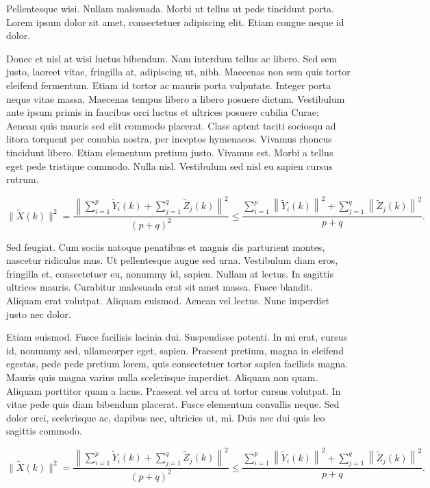 \documentclass[APA,STIX1COL]{WileyNJD-v2}
\begin{document}
Pellentesque wisi. Nullam malesuada. Morbi ut tellus ut pede tincidunt porta. Lorem ipsum dolor sit amet,
consectetuer adipiscing elit. Etiam congue neque id dolor.

Donec et nisl at wisi luctus bibendum. Nam interdum tellus ac libero. Sed sem justo, laoreet vitae, fringilla at,
adipiscing ut, nibh. Maecenas non sem quis tortor eleifend fermentum. Etiam id tortor ac mauris porta vulputate.
Integer porta neque vitae massa. Maecenas tempus libero a libero posuere dictum. Vestibulum ante ipsum primis in
faucibus orci luctus et ultrices posuere cubilia Curae; Aenean quis mauris sed elit commodo placerat. Class aptent
taciti sociosqu ad litora torquent per conubia nostra, per inceptos hymenaeos. Vivamus rhoncus tincidunt libero.
Etiam elementum pretium justo. Vivamus est. Morbi a tellus eget pede tristique commodo. Nulla nisl. Vestibulum
sed nisl eu sapien cursus rutrum.

\begin{equation}\label{eq23}
 \|\tilde{X}(k)\|^2
 =\frac{\left\|\sum\limits_{i=1}^{p}\tilde{Y}_i(k)+\sum\limits_{j=1}^{q}\tilde{Z}_j(k) \right\|^2}{(p+q)^2}
 \leq\frac{\sum\limits_{i=1}^{p}\left\|\tilde{Y}_i(k)\right\|^2+\sum\limits_{j=1}^{q}\left\|\tilde{Z}_j(k)\right\|^2 }{p+q}.
\end{equation}

Sed feugiat. Cum sociis natoque penatibus et magnis dis parturient montes, nascetur ridiculus mus. Ut pellentesque
augue sed urna. Vestibulum diam eros, fringilla et, consectetuer eu, nonummy id, sapien. Nullam at lectus. In sagittis
ultrices mauris. Curabitur malesuada erat sit amet massa. Fusce blandit. Aliquam erat volutpat. Aliquam euismod.
Aenean vel lectus. Nunc imperdiet justo nec dolor.

Etiam euismod. Fusce facilisis lacinia dui. Suspendisse potenti. In mi erat, cursus id, nonummy sed, ullamcorper
eget, sapien. Praesent pretium, magna in eleifend egestas, pede pede pretium lorem, quis consectetuer tortor sapien
facilisis magna. Mauris quis magna varius nulla scelerisque imperdiet. Aliquam non quam. Aliquam porttitor quam
a lacus. Praesent vel arcu ut tortor cursus volutpat. In vitae pede quis diam bibendum placerat. Fusce elementum
convallis neque. Sed dolor orci, scelerisque ac, dapibus nec, ultricies ut, mi. Duis nec dui quis leo sagittis commodo.

\begin{equation}\label{eq24}
 \|\tilde{X}(k)\|^2
 =\frac{\left\|\sum\limits_{i=1}^{p}\tilde{Y}_i(k)+\sum\limits_{j=1}^{q}\tilde{Z}_j(k) \right\|^2}{(p+q)^2}
 \leq\frac{\sum\limits_{i=1}^{p}\left\|\tilde{Y}_i(k)\right\|^2+\sum\limits_{j=1}^{q}\left\|\tilde{Z}_j(k)\right\|^2 }{p+q}.
\end{equation}
\end{document}

